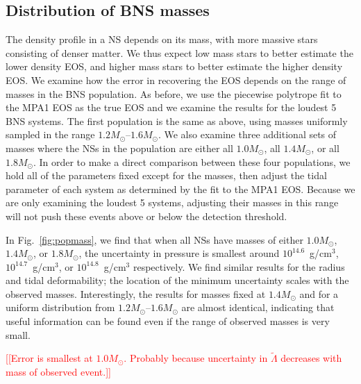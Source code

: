 \documentclass[twocolumn,prd,amssymb,aps,nofootinbib,showpacs,epsf]{revtex4}
\newcommand{\red}{\textcolor{red}}
\begin{document}
\subsection{Distribution of BNS masses}
\label{sec:varymass}

The density profile in a NS depends on its mass, with more massive stars consisting of denser matter. We thus expect low mass stars to better estimate the lower density EOS, and higher mass stars to better estimate the higher density EOS. We examine how the error in recovering the EOS depends on the range of masses in the BNS population. As before, we use the piecewise polytrope fit to the MPA1 EOS as the true EOS and we examine the results for the loudest 5 BNS systems. The first population is the same as above, using masses uniformly sampled in the range $1.2M_\odot$--$1.6M_\odot$. We also examine three additional sets of masses where the NSs in the population are either all $1.0M_\odot$, all $1.4M_\odot$, or all $1.8M_\odot$. In order to make a direct comparison between these four populations, we hold all of the parameters fixed except for the masses, then adjust the tidal parameter of each system as determined by the fit to the MPA1 EOS. Because we are only examining the loudest 5 systems, adjusting their masses in this range will not push these events above or below the detection threshold. 

In Fig.~\ref{fig:popmass}, we find that when all NSs have masses of either $1.0M_\odot$, $1.4M_\odot$, or $1.8M_\odot$, the uncertainty in pressure is smallest around $10^{14.6}$~g/cm$^3$, $10^{14.7}$~g/cm$^3$, or $10^{14.8}$~g/cm$^3$ respectively. We find similar results for the radius and tidal deformability; the location of the minimum uncertainty scales with the observed masses. Interestingly, the results for masses fixed at $1.4M_\odot$ and for a uniform distribution from $1.2M_\odot$--$1.6M_\odot$ are almost identical, indicating that useful information can be found even if the range of observed masses is very small.

\red{[[Error is smallest at $1.0M_\odot$. Probably because uncertainty in $\tilde\Lambda$ decreases with mass of observed event.]]} 
\end{document}
